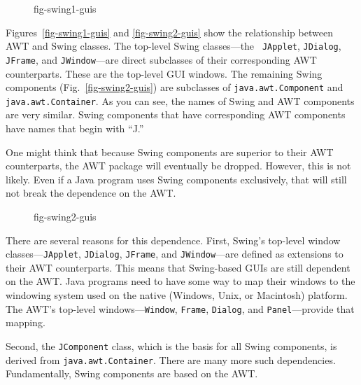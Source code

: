 \begin{figure}[tb]
{fig-swing1-guis}

\end{figure}

Figures~\ref{fig-swing1-guis} and \ref{fig-swing2-guis} show the relationship
between AWT and Swing classes. The top-level Swing classes---the {\tt
JApplet}, {\tt JDialog}, {\tt JFrame}, and {\tt JWindow}---are direct
subclasses of their corresponding AWT counterparts. These are the
top-level GUI windows. The remaining Swing components
(Fig.~\ref{fig-swing2-guis}) are subclasses of {\tt java.awt.Component}
and {\tt java.awt.Container}.  As you can see, the names of Swing and
AWT components are very similar. Swing components that have
corresponding AWT components have names that begin with ``J.''

One might think that because Swing components are superior
to their AWT counterparts, the AWT package will eventually be dropped.
However, this is not likely. Even if a Java program uses Swing
components exclusively, that will still not break the dependence on
the AWT.

\begin{figure}[tb]
 {fig-swing2-guis}

\end{figure}

There are several reasons for this dependence. First, Swing's
top-level window classes---{\tt JApplet}, {\tt JDialog}, {\tt JFrame},
and {\tt JWindow}---are defined as extensions to their AWT
counterparts.  This means that Swing-based GUIs are still dependent on
the AWT. Java programs need to have some way to map their windows to
the windowing system used on the native (Windows, Unix, or Macintosh)
platform.  The AWT's top-level windows---{\tt Window}, {\tt Frame},
{\tt Dialog}, and {\tt Panel}---provide that mapping.

Second, the {\tt JComponent} class, which is the basis for all Swing
components, is derived from {\tt java.awt.Container}. There are many
more such dependencies.  Fundamentally, Swing components are based on
the AWT.

